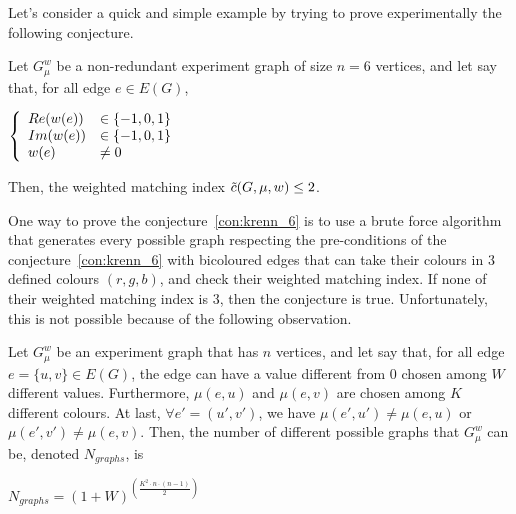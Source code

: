 Let's consider a quick and simple example by trying to prove experimentally the following conjecture.

\begin{conjecture}
    \label{con:krenn_6}
    Let $G_\mu^w$ be a non-redundant experiment graph of size $n = 6$ vertices, and let say that, for all edge $e \in E(G)$,
    \begin{center}
        $\left\{\begin{array}{l l}
            Re(w(e)) & \in \{-1, 0, 1\} \\
            Im(w(e)) & \in \{-1, 0, 1\} \\
            w(e)     & \neq 0          \\
        \end{array}\right.$
    \end{center}
    Then, the weighted matching index $\Tilde{c}(G, \mu, w) \leq 2$.
\end{conjecture}

One way to prove the conjecture~\ref{con:krenn_6} is to use a brute force algorithm that generates every possible graph respecting the pre-conditions of the conjecture~\ref{con:krenn_6} with bicoloured edges that can take their colours in $3$ defined colours $(r, g, b)$, and check their weighted matching index.
If none of their weighted matching index is $3$, then the conjecture is true.
Unfortunately, this is not possible because of the following observation.\\

\begin{observation}
    \label{obs:possible_graphs}
    Let $G_\mu^w$ be an experiment graph that has $n$ vertices, and let say that, for all edge $e = \{u, v\} \in E(G)$, the edge can have a value different from $0$ chosen among $W$ different values.
    Furthermore, $\mu(e, u)$ and $\mu(e, v)$ are chosen among $K$ different colours.
    At last, $\forall e' = (u', v')$, we have $\mu(e', u') \neq \mu(e, u)$ or $\mu(e', v') \neq \mu(e, v)$.
    Then, the number of different possible graphs that $G_\mu^w$ can be, denoted $N_{graphs}$, is

    \begin{center}
        $N_{graphs} = (1 + W)^{\left(\frac{K^2 \cdot n \cdot (n-1)}{2}\right)}$
    \end{center}
\end{observation}


